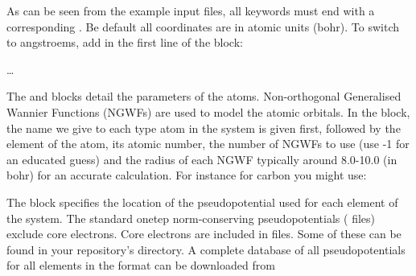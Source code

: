 \documentclass[letterpaper,10pt,english]{sphinxmanual}
\begin{document}
As can be seen from the example input files, all  keywords must
end with a corresponding . Be default all coordinates are in
atomic units (bohr). To switch to angstroems, add  in the first
line of the block:

\begin{DUlineblock}{0em}
\item[] 
\item[] 
\item[] 
\item[] 
\item[] …
\item[] 
\end{DUlineblock}

The  and  blocks detail the parameters of the
atoms. Non-orthogonal Generalised Wannier Functions (NGWFs) are used to
model the atomic orbitals. In the  block, the name we give to
each type atom in the system is given first, followed by the element of
the atom, its atomic number, the number of NGWFs to use (use -1 for an
educated guess) and the radius of each NGWF typically around 8.0-10.0
(in bohr) for an accurate calculation. For instance for carbon you might
use:


The  block specifies the location of the pseudopotential
used for each element of the system. The standard onetep norm-conserving
pseudopotentials ( files) exclude core electrons. Core
electrons are included in  files. Some of these can be found in
your repository’s  directory. A complete database of all
pseudopotentials for all elements in the  format can be
downloaded from
\end{document}

